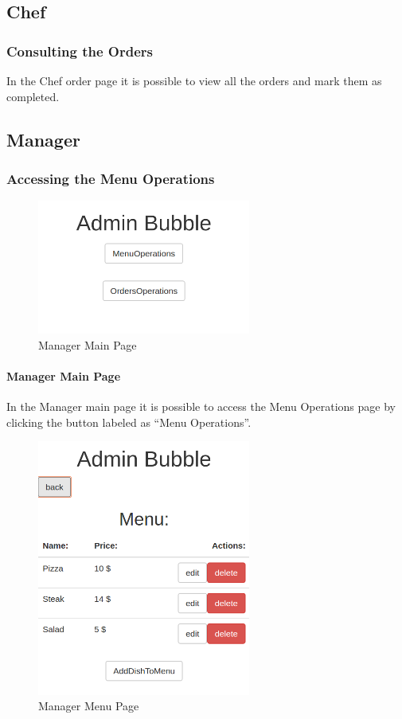 \subsection{Chef}
\subsubsection{Consulting the Orders}
In the Chef order page it is possible to view all the orders and mark them as completed.

\subsection{Manager}
\subsubsection{Accessing the Menu Operations}
\begin{figure}[H]
	\centering
	\includegraphics[width=7cm]{../../documenti/UserManualDemo/demo_screens/admin_main.png}
	\caption{Manager Main Page}
\end{figure}
\paragraph{Manager Main Page}
In the Manager main page it is possible to access the Menu Operations page by clicking the button labeled as ``Menu Operations''.

\begin{figure}[H]
	\centering
	\includegraphics[width=7cm]{../../documenti/UserManualDemo/demo_screens/admin_menu.png}
	\caption{Manager Menu Page}
\end{figure}
